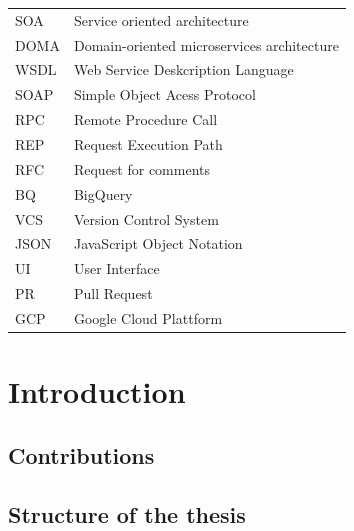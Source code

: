 \documentclass[english, 12pt, a4paper, sci, utf8, a-1b, online]{aaltothesis}
\begin{document}
\begin{tabular}{ll}
SOA          & Service oriented architecture \\
DOMA         & Domain-oriented microservices architecture \\
WSDL         & Web Service Deskcription Language \\
SOAP         & Simple Object Acess Protocol \\
RPC          & Remote Procedure Call \\
REP          & Request Execution Path \\
RFC          & Request for comments \\
BQ           & BigQuery \\
VCS          & Version Control System\\
JSON         & JavaScript Object Notation\\
UI           & User Interface\\
PR           & Pull Request\\
GCP          & Google Cloud Plattform\\

\end{tabular}


\cleardoublepage


\section{Introduction}


\subsection{Contributions}


\subsection{Structure of the thesis}
\end{document}
